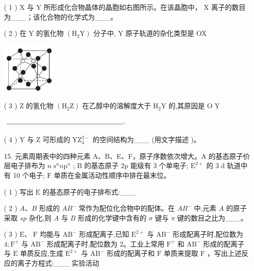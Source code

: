 \documentclass[10pt]{article}
\begin{document}
( 1 ) \(\mathrm{X}\) 与 \(\mathrm{Y}\) 所形成化合物晶体的晶胞如右图所示。在该晶胞中， \(\mathrm{X}\) 离子的数目为\_\_\_；该化合物的化学式为\_\_\_。

( 2 ) 在 \(\mathrm{Y}\) 的氢化物 \(\left( {{\mathrm{H}}_{2}\mathrm{Y}}\right)\) 分子中, \(\mathrm{Y}\) 原子轨道的杂化类型是 OX

\begin{center}
\includegraphics[max width=0.2\textwidth]{images/0190e026-5a11-7df7-bd27-54d09026ba7a_106_352471.jpg}
\end{center}

( 3 ) \(\mathrm{Z}\) 的氢化物 \(\left( {{\mathrm{H}}_{2}\mathrm{Z}}\right)\) 在乙醇中的溶解度大于 \({\mathrm{H}}_{2}\mathrm{Y}\) 的,其原因是 O Y

\begin{center}
\includegraphics[max width=0.5\textwidth]{images/0190e026-5a11-7df7-bd27-54d09026ba7a_106_171816.jpg}
\end{center}

( 4 ) \(\mathrm{Y}\) 与 \(\mathrm{Z}\) 可形成的 \({\mathrm{{YZ}}}_{4}^{2 - }\) 的空间结构为\_\_\_ (用文字描述 )。

15. 元素周期表中的四种元素 A、B、E、F，原子序数依次增大。A 的基态原子价层电子排布为 \(n{\mathrm{\;s}}^{n}n{\mathrm{p}}^{n}\) ; \(\mathrm{B}\) 的基态原子 \(2\mathrm{p}\) 能级有 3 个单电子; \({\mathrm{E}}^{2 + }\) 的 \(3\mathrm{\;d}\) 轨道中有 10 个电子; \(\mathrm{F}\) 单质在金属活动性顺序中排在最末位。

( 1 ) 写出 \(\mathrm{E}\) 的基态原子的电子排布式:\_\_\_

( 2 ) \(A\text{、}B\) 形成的 \(A{B}^{ - }\) 常作为配位化合物中的配体。在 \(A{B}^{ - }\) 中,元素 \(A\) 的原子采取 \({sp}\) 杂化,则 \(A\) 与 \(B\) 形成的化学键中含有的 \(\sigma\) 键与 \(\pi\) 键的数目之比为\_\_\_。

( 3 ) \(\mathrm{E}\text{、}\mathrm{\;F}\) 均能与 \({\mathrm{{AB}}}^{ - }\) 形成配离子,已知 \({\mathrm{E}}^{2 + }\) 与 \({\mathrm{{AB}}}^{ - }\) 形成配离子时,配位数为 \(4;{\mathrm{F}}^{ + }\) 与 \({\mathrm{{AB}}}^{ - }\) 形成配离子时,配位数为 2。工业上常用 \({\mathrm{F}}^{ + }\) 和 \({\mathrm{{AB}}}^{ - }\) 形成的配离子与 \(\mathrm{E}\) 单质反应,生成 \({\mathrm{E}}^{2 + }\) 与 \({\mathrm{{AB}}}^{ - }\) 形成的配离子和 \(\mathrm{F}\) 单质来提取 \(\mathrm{F}\) ，写出上述反应的离子方程式:\_\_\_ 实验活动
\end{document}
